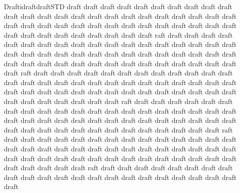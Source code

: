 \begin{MXContent}{Draftidraft}{draft}{STD}
draft draft draft draft draft draft draft draft draft draft draft draft draft draft draft draft draft draft draft draft draft draft draft draft draft draft draft draft draft draft draft draft draft draft draft draft draft draft draft draft draft draft draft draft draft draft draft raft draft draft draft draft draft draft draft draft draft draft draft draft draft draft draft draft draft draft draft draft draft draft draft  draft draft draft draft draft draft draft draft draft draft draft draft draft draft draft draft draft draft draft draft draft draft draft draft raft draft draft draft draft draft draft draft draft draft draft draft draft draft draft draft draft draft draft draft draft draft draft draft draft draft draft draft draft draft draft draft draft draft draft draft draft draft draft draft draft draft draft draft draft draft draft draft raft draft draft draft draft draft draft draft draft draft draft draft draft draft draft draft draft draft draft draft draft draft draft draft draft draft draft draft draft draft draft draft draft draft draft draft draft draft draft draft draft draft draft draft draft draft draft draft raft draft draft draft draft draft draft draft draft draft draft draft draft draft draft draft draft draft draft draft draft draft draft draft draft draft draft draft draft draft draft draft draft draft draft draft draft draft draft draft draft draft draft draft draft draft draft draft raft draft draft draft draft draft draft draft draft draft draft draft draft draft draft draft draft draft draft draft draft draft draft draft
\end{MXContent}
